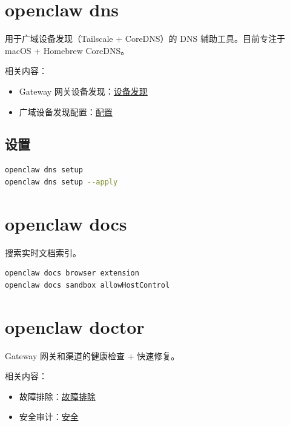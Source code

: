 \clearpage

\section{openclaw dns}


用于广域设备发现（Tailscale + CoreDNS）的 DNS 辅助工具。目前专注于 macOS + Homebrew CoreDNS。

相关内容：

\begin{itemize}
  \item Gateway 网关设备发现：\href{/gateway/discovery}{设备发现}
  \item 广域设备发现配置：\href{/gateway/configuration}{配置}
\end{itemize}


\subsection{设置}


\begin{lstlisting}[language=bash]
openclaw dns setup
openclaw dns setup --apply
\end{lstlisting}



\clearpage

\section{openclaw docs}


搜索实时文档索引。

\begin{lstlisting}[language=bash]
openclaw docs browser extension
openclaw docs sandbox allowHostControl
\end{lstlisting}



\clearpage

\section{openclaw doctor}


Gateway 网关和渠道的健康检查 + 快速修复。

相关内容：

\begin{itemize}
  \item 故障排除：\href{/gateway/troubleshooting}{故障排除}
  \item 安全审计：\href{/gateway/security}{安全}
\end{itemize}



